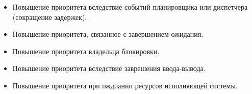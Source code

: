 \begin{itemize}
    \item Повышение приоритета вследствие событий планировщика или диспетчера (сокращение задержек).


    \item Повышение приоритета, связанное с завершением ожидания.


    \item Повышение приоритета владельца блокировки.


    \item Повышение приоритета вследствие заврешения ввода-вывода.


    \item Повышение приоритета при ождиании ресурсов исполняющей системы.



\end{itemize}
